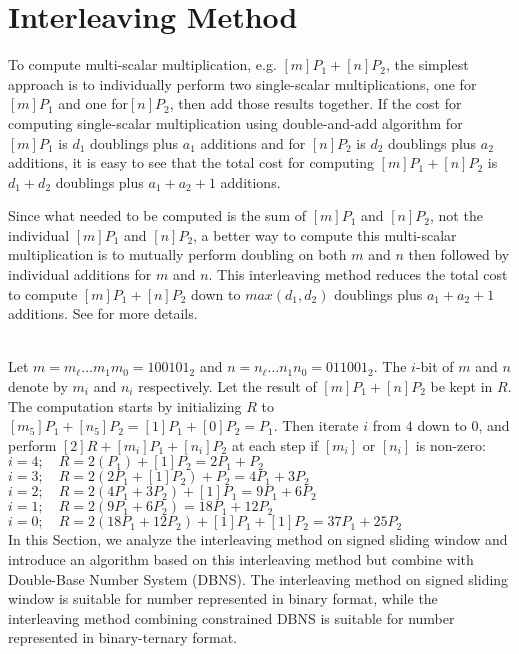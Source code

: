 \section{Interleaving Method}
\label{sec:interleaving}
To compute multi-scalar multiplication, e.g. $[m]P_1+[n]P_2$,
the simplest approach is to individually perform two single-scalar multiplications,
one for $[m]P_1$ and one for$[n]P_2$, then add those results together.
If the cost for computing single-scalar multiplication using double-and-add algorithm
for $[m]P_1$ is $d_1$ doublings plus $a_1$ additions and for $[n]P_2$ is $d_2$ doublings plus $a_2$ additions,
it is easy to see that the total cost for computing $[m]P_1 + [n]P_2$ is $d_1 + d_2$ doublings plus $a_1 + a_2 + 1$ additions.

Since what needed to be computed is the sum of $[m]P_1$ and $[n]P_2$, not the individual $[m]P_1$ and $[n]P_2$,
a better way to compute this multi-scalar multiplication is to mutually perform doubling on both $m$ and $n$
then followed by individual additions for $m$ and $n$.
This interleaving method reduces the total cost to compute $[m]P_1 + [n]P_2$ down to
$max(d_1,d_2)$ doublings plus $a_1 + a_2 + 1$ additions.
See \cite{DI08} for more details.

 \\
Let $m = m_\ell \dots m_1 m_0 = {100101}_2$ and $n = n_\ell \dots n_1 n_0 = {011001}_2$.
The $i$-bit of $m$ and $n$ denote by $m_i$ and $n_i$ respectively.
Let the result of $[m]P_1 + [n]P_2$ be kept in $R$.
The computation starts by initializing $R$ to $[m_5]P_1 + [n_5]P_2 = [1]P_1 + [0]P_2 = P_1$.
Then iterate $i$ from $4$ down to $0$, and perform $[2]R + [m_i]P_1 + [n_i]P_2$ at each step if $[m_i]$ or $[n_i]$ is non-zero: \\
$i=4; \quad R = 2(P_1) + [1]P_2 = 2P_1 + P_2$ \\
$i=3; \quad R = 2(2P_1 + [1]P_2) + P_2 = 4P_1 + 3P_2$ \\
$i=2; \quad R = 2(4P_1 + 3P_2) + [1]P_1 = 9P_1 + 6P_2$ \\
$i=1; \quad R = 2(9P_1 + 6P_2) = 18P_1 + 12P_2$ \\
$i=0; \quad R = 2(18P_1 + 12P_2) + [1]P_1 + [1]P_2 = 37P_1 + 25P_2$ \\

In this Section, we analyze the interleaving method on signed sliding window \cite{interleaving}
and introduce an algorithm based on this interleaving method but combine with Double-Base Number System (DBNS).
The interleaving method on signed sliding window is suitable for number represented in binary format,
while the interleaving method combining constrained DBNS is suitable for number represented in binary-ternary format.



